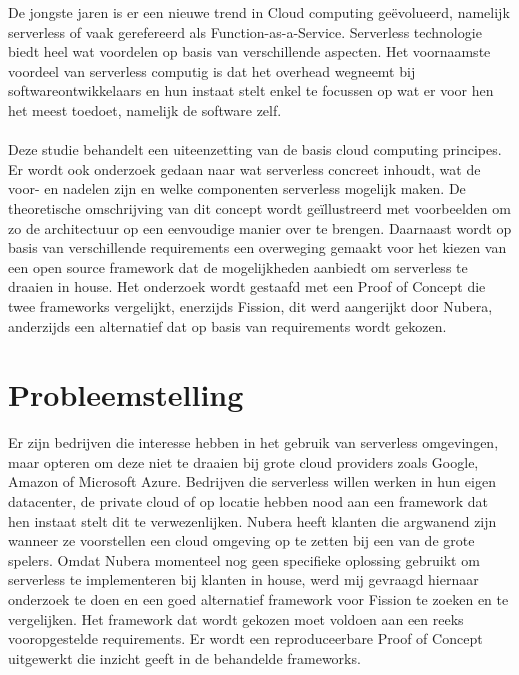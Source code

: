 De jongste jaren is er een nieuwe trend in Cloud computing geëvolueerd, namelijk serverless of vaak gerefereerd als Function-as-a-Service. Serverless technologie biedt heel wat voordelen op basis van verschillende aspecten. Het voornaamste voordeel van serverless computig is dat het overhead wegneemt bij softwareontwikkelaars en hun instaat stelt enkel te focussen op wat er voor hen het meest toedoet, namelijk de software zelf.
\\\\

Deze studie behandelt een uiteenzetting van de basis cloud computing principes. Er wordt ook onderzoek gedaan naar wat serverless concreet inhoudt, wat de voor- en nadelen zijn en welke componenten serverless mogelijk maken. De theoretische omschrijving van dit concept wordt geïllustreerd met voorbeelden om zo de architectuur op een eenvoudige manier over te brengen. Daarnaast wordt op basis van verschillende requirements een overweging gemaakt voor het kiezen van een open source framework dat de mogelijkheden aanbiedt om serverless te draaien in house. Het onderzoek wordt gestaafd met een Proof of Concept die twee frameworks vergelijkt, enerzijds Fission, dit werd aangerijkt door Nubera, anderzijds een alternatief dat op basis van requirements wordt gekozen.

\section{Probleemstelling}
\label{sec:probleemstelling}


Er zijn bedrijven die interesse hebben in het gebruik van serverless omgevingen, maar opteren om deze niet te draaien bij grote cloud providers zoals Google, Amazon of Microsoft Azure. Bedrijven die serverless willen werken in hun eigen datacenter, de private cloud of op locatie hebben nood aan een framework dat hen instaat stelt dit te verwezenlijken. Nubera heeft klanten die argwanend zijn wanneer ze voorstellen een cloud omgeving op te zetten bij een van de grote spelers. Omdat Nubera momenteel nog geen specifieke oplossing gebruikt om serverless te implementeren bij klanten in house, werd mij gevraagd hiernaar onderzoek te doen en een goed alternatief framework voor Fission te zoeken en te vergelijken. Het framework dat wordt gekozen moet voldoen aan een reeks vooropgestelde requirements. Er wordt een reproduceerbare Proof of Concept uitgewerkt die inzicht geeft in de behandelde frameworks.

